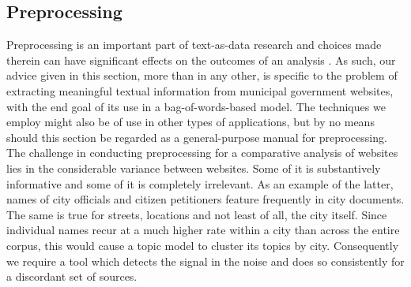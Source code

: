 \documentclass[11pt]{article}
\begin{document}
\subsection{Preprocessing}
Preprocessing is an important part of text-as-data research and choices made therein can have significant effects on the outcomes of an analysis \citep{denny2018text}. As such, our advice given in this section, more than in any other, is specific to the problem of extracting meaningful textual information from municipal government websites, with the end goal of its use in a bag-of-words-based model. The techniques we employ might also be of use in other types of applications, but by no means should this section be regarded as a general-purpose manual for preprocessing. The challenge in conducting preprocessing for a comparative analysis of websites lies in the considerable variance between websites. Some of it is substantively informative and some of it is completely irrelevant. As an example of the latter, names of city officials and citizen petitioners feature frequently in city documents. The same is true for streets, locations and not least of all, the city itself. Since individual names recur at a much higher rate within a city than across the entire corpus, this would cause a topic model to cluster its topics by city. Consequently we require a tool which detects the signal in the noise and does so consistently for a discordant set of sources.

\end{document}
